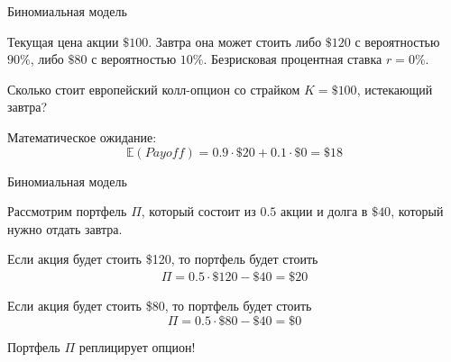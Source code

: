 \documentclass{beamer}
\begin{document}
\begin{frame}{Биномиальная модель}
\centering
{}

\justify
Текущая цена акции $\$100$. Завтра она может стоить либо $\$120$ с вероятностью $90\%$, либо $\$80$ с вероятностью $10\%$. Безрисковая процентная ставка $r=0\%$.

\justify
Сколько стоит европейский колл-опцион со страйком $K=\$100$, истекающий завтра?

\justify
Математическое ожидание:
$$\mathbb{E}(Payoff) = 0.9\cdot \$20 + 0.1\cdot \$0 = \$18 $$
\end{frame}



\begin{frame}{Биномиальная модель}
\centering
{}

\justify
Рассмотрим портфель $\Pi$, который состоит из $0.5$ акции и долга в $\$40$, который нужно отдать завтра.

\justify
Если акция будет стоить \$120, то портфель будет стоить
\begin{align*}\Pi = 0.5\cdot\$120 - \$40 = \$20\end{align*}

\justify
Если акция будет стоить \$80, то портфель будет стоить
$$\Pi = 0.5 \cdot \$80 - \$40 = \$0$$

\justify
Портфель $\Pi$ \alert{реплицирует} опцион!
\end{frame}
\end{document}
